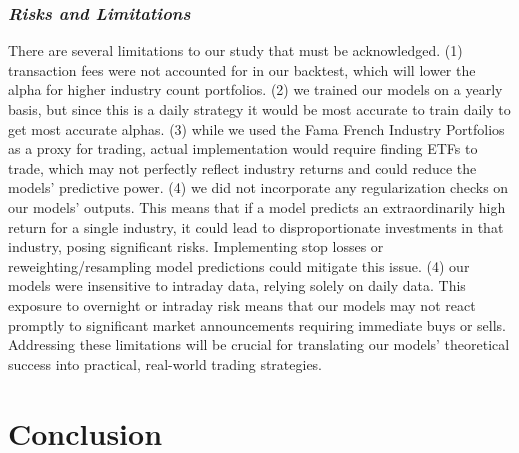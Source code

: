 \documentclass{article}
\begin{document}
\subsubsection{\emph{Risks and Limitations}}
There are several limitations to our study that must be acknowledged. (1) transaction fees were not accounted for in our backtest, which will lower the alpha for higher industry count portfolios. (2) we trained our models on a yearly basis, but since this is a daily strategy it would be most accurate to train daily to get most accurate alphas. (3) while we used the Fama French Industry Portfolios as a proxy for trading, actual implementation would require finding ETFs to trade, which may not perfectly reflect industry returns and could reduce the models' predictive power. (4) we did not incorporate any regularization checks on our models' outputs. This means that if a model predicts an extraordinarily high return for a single industry, it could lead to disproportionate investments in that industry, posing significant risks. Implementing stop losses or reweighting/resampling model predictions could mitigate this issue. (4) our models were insensitive to intraday data, relying solely on daily data. This exposure to overnight or intraday risk means that our models may not react promptly to significant market announcements requiring immediate buys or sells. Addressing these limitations will be crucial for translating our models' theoretical success into practical, real-world trading strategies.

\medskip

\medskip

\section{Conclusion}
\end{document}
